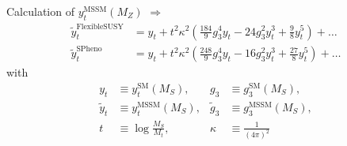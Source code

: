 \documentclass[hyperref={pdfpagelabels=false},ngerman]{beamer}
\newcommand{\SM}{\ensuremath{\text{SM}}}
\begin{document}
\newcommand{\FS}{FlexibleSUSY\xspace}
\newcommand{\SARAH}{SARAH\xspace}
\newcommand{\Softsusy}{SOFTSUSY\xspace}
\newcommand{\SPheno}{SPheno\xspace}
\newcommand{\SUSYHD}{SUSYHD\xspace}

\newcommand{\bgsgs}{\beta_{\gshigh,\gshigh^2}}
\newcommand{\bytgs}{\beta_{\ythigh,\gshigh^2}}
\newcommand{\bytyt}{\beta_{\ythigh,\ythigh^2}}
\newcommand{\bvyt}{\beta_{\vhigh,\ythigh^2}}
\newcommand{\blambdaytyt}{\beta_{\lambdahigh,\ythigh^4}}
\newcommand{\blambdayt}{\beta_{\lambdahigh,\ythigh^2\lambdahigh}}
\newcommand{\blambdalambda}{\beta_{\lambdahigh,\lambdahigh^2}}
\newcommand{\btildegsgs}{\tilde\beta_{\gshigh,\gshigh^2}}
\newcommand{\btildeytgs}{\tilde\beta_{\ythigh,\gshigh^2}}
\newcommand{\btildeytyt}{\tilde\beta_{\ythigh,\ythigh^2}}
\newcommand{\btildevyt}{\tilde\beta_{\vhigh,\ythigh^2}}

\newcommand{\gs}{\hat{g}_3}
\newcommand{\gsMSSM}{\bar{g}_3}
\newcommand{\ytlow}{\hat{y}_t}
\newcommand{\ytMSSMlow}{\bar{y}_t}
\newcommand{\vlow}{\hat{v}}
\newcommand{\vMSSM}{\bar{v}}
\newcommand{\gshigh}{{g}_3}
\newcommand{\gsMSSMhigh}{\tilde{g}_3}
\newcommand{\ythigh}{y_t}
\newcommand{\ytMSSMhigh}{\tilde{y}_t}
\newcommand{\vhigh}{v}
\newcommand{\vMSSMhigh}{\tilde{v}}
\newcommand{\lambdalow}{\hat{\lambda}}
\newcommand{\lambdahigh}{{\lambda}}

\newcommand{\kappaL}{\kappa}

\begin{frame}[noframenumbering]{Calculation of $y_t^{\text{MSSM}}(M_Z)$}
  $\Rightarrow$
  \begin{align*}
    \ytMSSMhigh^{\text{\FS}} &= 
    \ythigh +
    t^2\kappaL^2 \left(\frac{184}{9} \gshigh^4 \ythigh -24 \gshigh^2
      \ythigh^3 
      +\frac{9}{8} \ythigh^5 \right) 
    +\ldots\\
    \ytMSSMhigh^{\text{\SPheno}} &= 
    \ythigh +
    t^2 \kappaL^2 \left(\frac{248}{9} \gshigh^4 \ythigh-16 \gshigh^2
      \ythigh^3
      +\frac{27}{8} \ythigh^5\right) 
    +\ldots
  \end{align*}
  with
  \begin{align*}
    y_t &\equiv y_t^\SM(M_S), & g_3 &\equiv g_3^\SM(M_S), \\
    \tilde{y}_t &\equiv y_t^\text{MSSM}(M_S), & \tilde{g}_3 &\equiv g_3^\text{MSSM}(M_S), \\
    t &\equiv \log\frac{M_S}{M_t}, & \kappaL &\equiv \frac{1}{(4 \pi)^2}
  \end{align*}
\end{frame}
\end{document}
